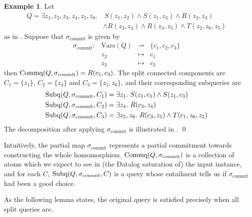 \documentclass[12pt]{report}
\theoremstyle{plain}
\theoremstyle{definition}
\newtheorem{example}[theorem]{Example}
\def\Vars{{\mathrm{Vars}}}
\newcommand{\Subq}[3]{\ensuremath{\normalfont{\textrm{Subq}}\!\left( #1, #2, #3 \right)}}
\newcommand{\Commq}[2]{\ensuremath{\normalfont{\textrm{Commq}}\!\left( #1, #2 \right)}}
\begin{document}
\begin{example}
\label{example:bcq-decomposition}
  Let
  \begin{align*}
    Q = \exists z_1,z_2,z_3,z_4,z_5,z_6.&\ S(z_1, z_2) \wedge S(z_1,z_3) \wedge R(z_2, z_3) \\
    &\wedge R(z_3, z_4) \wedge R(z_3, z_5) \wedge T(z_2, z_6, z_5)
  \end{align*}
  as in . Suppose that $\sigma_{\mathrm{commit}}$ is given by \[\begin{array}{cccc}
    \sigma_{\mathrm{commit}}: &\Vars(Q) &\rightharpoonup &\{c_1, c_2, c_3\} \\
    &z_2 &\mapsto &c_1 \\
    &z_3 &\mapsto &c_3
  \end{array}\]
  then $\Commq{Q}{\sigma_{\mathrm{commit}}} = R(c_1, c_3)$. The split connected components are $C_1 = \{z_1\}$, $C_2 = \{z_4\}$ and $C_3 = \{z_5, z_6\}$, and their corresponding subqueries are
  \begin{align*}
    \Subq{Q}{\sigma_{\mathrm{commit}}}{C_1} &= \exists z_1.\ S(z_1, c_1) \wedge S(z_1, c_3) \\
    \Subq{Q}{\sigma_{\mathrm{commit}}}{C_2} &= \exists z_4.\ R(c_3, z_4) \\
    \Subq{Q}{\sigma_{\mathrm{commit}}}{C_3} &= \exists z_5, z_6.\ R(c_3, z_5) \wedge T(c_1, z_6, z_5)
  \end{align*}
  The decomposition after applying $\sigma_{\mathrm{commit}}$ is illustrated in .
  \qed
\end{example}

Intuitively, the partial map $\sigma_{\mathrm{commit}}$ represents a partial commitment towards constructing the whole homomorphism. $\Commq{Q}{\sigma_{\mathrm{commit}}}$ is a collection of atoms which we expect to see in (the Datalog saturation of) the input instance, and for each $C$, $\Subq{Q}{\sigma_{\mathrm{commit}}}{C}$ is a query whose entailment tells us if $\sigma_{\mathrm{commit}}$ had been a good choice.

As the following lemma states, the original query is satisfied precisely when all split queries are.
\end{document}
